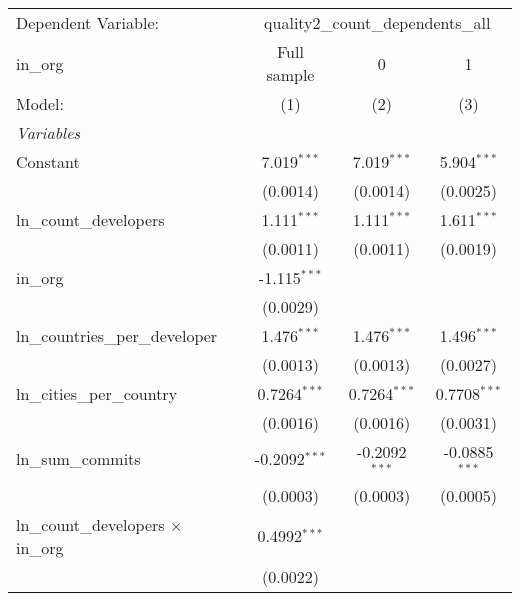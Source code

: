 \begingroup
\centering
\begin{tabular}{lccc}
   \tabularnewline \midrule \midrule
   Dependent Variable: & \multicolumn{3}{c}{quality2\_count\_dependents\_all}\\
   in\_org                                             & Full sample     & 0               & 1 \\   
   Model:                                              & (1)             & (2)             & (3)\\  
   \midrule
   \emph{Variables}\\
   Constant                                            & 7.019$^{***}$   & 7.019$^{***}$   & 5.904$^{***}$\\   
                                                       & (0.0014)        & (0.0014)        & (0.0025)\\   
   ln\_count\_developers                               & 1.111$^{***}$   & 1.111$^{***}$   & 1.611$^{***}$\\   
                                                       & (0.0011)        & (0.0011)        & (0.0019)\\   
   in\_org                                             & -1.115$^{***}$  &                 &   \\   
                                                       & (0.0029)        &                 &   \\   
   ln\_countries\_per\_developer                       & 1.476$^{***}$   & 1.476$^{***}$   & 1.496$^{***}$\\   
                                                       & (0.0013)        & (0.0013)        & (0.0027)\\   
   ln\_cities\_per\_country                            & 0.7264$^{***}$  & 0.7264$^{***}$  & 0.7708$^{***}$\\   
                                                       & (0.0016)        & (0.0016)        & (0.0031)\\   
   ln\_sum\_commits                                    & -0.2092$^{***}$ & -0.2092$^{***}$ & -0.0885$^{***}$\\   
                                                       & (0.0003)        & (0.0003)        & (0.0005)\\   
   ln\_count\_developers $\times$ in\_org              & 0.4992$^{***}$  &                 &   \\   
                                                       & (0.0022)        &                 &   \\   

\end{tabular}
